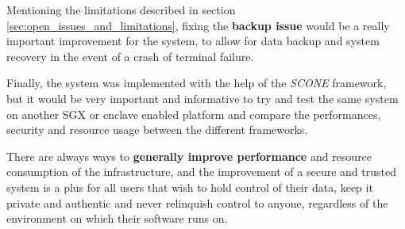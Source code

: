 Mentioning the limitations described in section \ref{sec:open_issues_and_limitations}, fixing the \textbf{backup issue} would be a really important improvement for the system, to allow for data backup and system recovery in the event of a crash of terminal failure.

Finally, the system was implemented with the help of the \textit{SCONE} framework, but it would be very important and informative to try and test the same system on another \gls{SGX} or enclave enabled platform and compare the performances, security and resource usage between the different frameworks.

There are always ways to \textbf{generally improve performance} and resource consumption of the infrastructure, and the improvement of a secure and trusted system is a plus for all users that wish to hold control of their data, keep it private and authentic and never relinquish control to anyone, regardless of the environment on which their software runs on.
